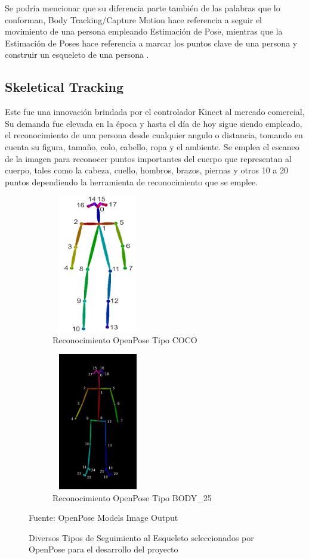 Se podría mencionar que su diferencia parte también de las palabras que lo conforman, Body Tracking/Capture Motion hace referencia a seguir el movimiento de una persona empleando Estimación de Pose, mientras que la Estimación de Poses hace referencia a marcar los puntos clave de una persona y construir un esqueleto de una persona \cite{oved2018real}.

\subsection{Skeletical Tracking}

Este fue una innovación brindada por el controlador Kinect al mercado comercial, Su demanda fue elevada en la época y hasta el día de hoy sigue siendo empleado, el reconocimiento de una persona desde cualquier angulo o distancia, tomando en cuenta su figura, tamaño, colo, cabello, ropa y el ambiente. Se emplea el escaneo de la imagen para reconocer puntos importantes del cuerpo que representan al cuerpo, tales como la cabeza, cuello, hombros, brazos, piernas y otros 10 a 20 puntos dependiendo la herramienta de reconocimiento que se emplee.


\begin{figure}[ht]
	\centering
	\begin{subfigure}{.5\textwidth}
		\centering
		\includegraphics[width=4cm,height=6cm]{./Images/openposet1.png}
		\caption{Reconocimiento OpenPose Tipo COCO}
		\label{open1}
	\end{subfigure}%
	\begin{subfigure}{.5\textwidth}
		\centering
		\includegraphics[width=4cm,height=6cm]{./Images/openposet2.png}
		\caption{Reconocimiento OpenPose Tipo BODY\_25}
		\label{open2}
	\end{subfigure}
	\caption{Diversos Tipos de Seguimiento al Esqueleto seleccionados por OpenPose para el desarrollo del proyecto}
	\label{exampleesqueletotrack}
	\footnotesize Fuente: OpenPose Models Image Output \cite{cao2017realtime} \cite{8765346}
\end{figure}

